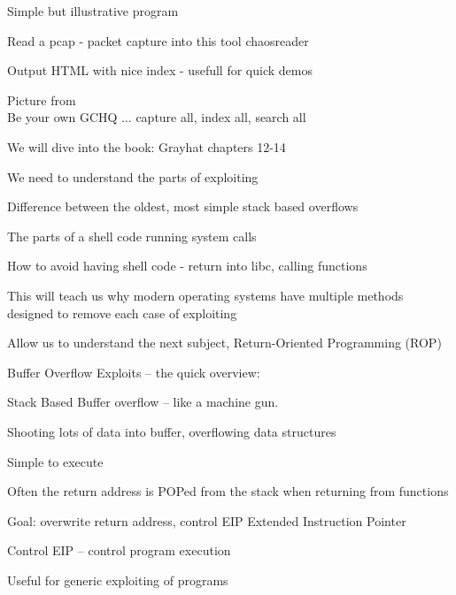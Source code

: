 \documentclass[Screen16to9,17pt]{foils}
\begin{document}
\begin{list1}
\item Simple but illustrative program
\item Read a pcap - packet capture into this tool chaosreader
\item Output HTML with nice index - usefull for quick demos
\item {}

\end{list1}



Picture from \\
Be your own GCHQ ... capture all, index all, search all









\begin{list1}
\item We will dive into the book: Grayhat chapters 12-14
\item We need to understand the parts of exploiting
\item Difference between the oldest, most simple stack based overflows
\item The parts of a shell code running system calls
\item How to avoid having shell code - return into libc, calling functions
\item This will teach us why modern operating systems have multiple methods designed to remove each case of exploiting
\item Allow us to understand the next subject, Return-Oriented Programming (ROP)
\end{list1}



Buffer Overflow Exploits -- the quick overview:
\begin{list1}
\item Stack Based Buffer overflow -- like a machine gun.
\begin{list2}
\item Shooting lots of data into buffer, overflowing data structures
\item Simple to execute
\item Often the return address is POPed from the stack when returning from functions
\item Goal: overwrite return address, control EIP Extended Instruction Pointer
\item Control EIP -- control program execution
\end{list2}
\item Useful for generic exploiting of programs
\end{list1}
\end{document}
